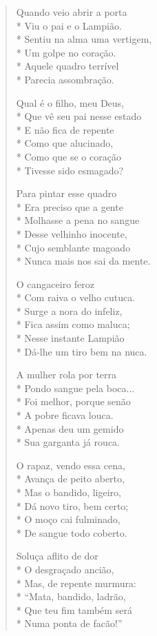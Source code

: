 \begin{verse}
Quando veio abrir a porta\\*
Viu o pai e o Lampião.\\*
Sentiu na alma uma vertigem,\\*
Um golpe no coração.\\*
Aquele quadro terrível\\*
Parecia assombração.

Qual é o filho, meu Deus,\\*
Que vê seu pai nesse estado\\*
E não fica de repente\\*
Como que alucinado,\\*
Como que se o coração\\*
Tivesse sido esmagado?

Para pintar esse quadro\\*
Era preciso que a gente\\*
Molhasse a pena no sangue\\*
Desse velhinho inocente,\\*
Cujo semblante magoado\\*
Nunca mais nos sai da mente.

O cangaceiro feroz\\*
Com raiva o velho cutuca.\\*
Surge a nora do infeliz,\\*
Fica assim como maluca;\\*
Nesse instante Lampião\\*
Dá-lhe um tiro bem na nuca.

A mulher rola por terra\\*
Pondo sangue pela boca...\\*
Foi melhor, porque senão \\*
A pobre ficava louca.\\*
Apenas deu um gemido\\*
Sua garganta já rouca.

O rapaz, vendo essa cena,\\*
Avança de peito aberto,\\*
Mas o bandido, ligeiro,\\*
Dá novo tiro, bem certo;\\*
O moço cai fulminado,\\*
De sangue todo coberto.

Soluça aflito de dor\\*
O desgraçado ancião,\\*
Mas, de repente murmura:\\*
“Mata, bandido, ladrão,\\*
Que teu fim também será\\*
Numa ponta de facão!”


\end{verse}
